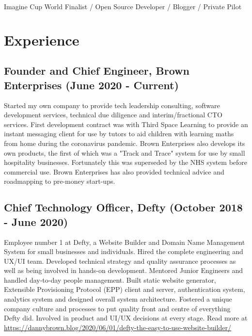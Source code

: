 \documentclass[10pt,letterpaper]{article}
\begin{document}

	\noindent Imagine Cup World Finalist / Open Source Developer / Blogger / Private Pilot

	\noindent\makebox[\linewidth]{\rule{\textwidth}{0.4pt}}
	
	\section*{Experience}
	\subsection*{Founder and Chief Engineer, Brown Enterprises \small{(June 2020 - Current)}}
	Started my own company to provide tech leadership consulting, software development services, technical due diligence and interim/fractional CTO services. First development contract was with Third Space Learning to provide an instant messaging client for use by tutors to aid children with learning maths from home during the coronavirus pandemic. Brown Enterprises also develops its own products, the first of which was a "Track and Trace" system for use by small hospitality businesses. Fortunately this was superseded by the NHS system before commercial use. Brown Enterprises has also provided technical advice and roadmapping to pre-money start-ups.
	
	\subsection*{Chief Technology Officer, Defty \small{(October 2018 - June 2020)}}
	Employee number 1 at Defty, a Website Builder and Domain Name Management System for small businesses and individuals. 
	Hired the complete engineering and UX/UI team. Developed technical strategy and quality assurance processes as well as being involved in hands-on development. Mentored Junior Engineers and handled day-to-day people management. Built static website generator, Extensible Provisioning Protocol (EPP) client and server, authentication system, analytics system and designed overall system architecture. Fostered a unique company culture and processes to put quality front and centre of everything Defty did. Involved in product and UI/UX decisions at every stage. Read more at \href{https://dannybrown.blog/2020/06/01/defty-the-easy-to-use-website-builder/}{https://dannybrown.blog/2020/06/01/defty-the-easy-to-use-website-builder/}
	
\end{document}
